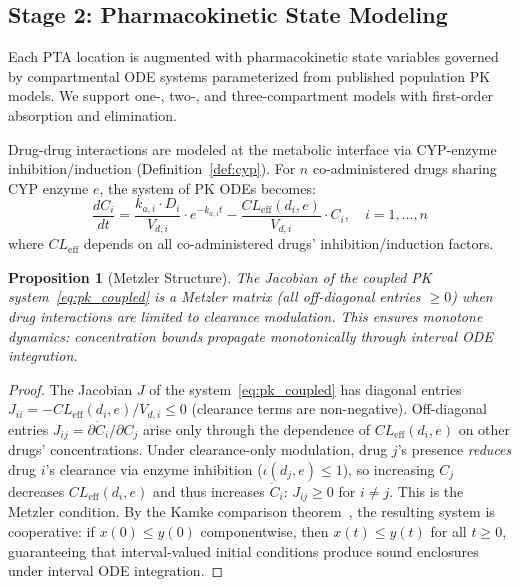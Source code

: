 \documentclass{article}
\newtheorem{proposition}[theorem]{Proposition}
\theoremstyle{definition}
\begin{document}
\subsection{Stage 2: Pharmacokinetic State Modeling}

Each PTA location is augmented with pharmacokinetic state variables governed by compartmental ODE systems parameterized from published population PK models. We support one-, two-, and three-compartment models with first-order absorption and elimination.

Drug-drug interactions are modeled at the metabolic interface via CYP-enzyme inhibition/induction (Definition~\ref{def:cyp}). For $n$ co-administered drugs sharing CYP enzyme $e$, the system of PK ODEs becomes:
\begin{equation}
\label{eq:pk_coupled}
\frac{dC_i}{dt} = \frac{k_{a,i} \cdot D_i}{V_{d,i}} \cdot e^{-k_{a,i} t} - \frac{CL_{\text{eff}}(d_i, e)}{V_{d,i}} \cdot C_i, \quad i = 1,\ldots,n
\end{equation}
where $CL_{\text{eff}}$ depends on all co-administered drugs' inhibition/induction factors.

\begin{proposition}[Metzler Structure]
\label{prop:metzler}
The Jacobian of the coupled PK system~\eqref{eq:pk_coupled} is a Metzler matrix (all off-diagonal entries $\geq 0$) when drug interactions are limited to clearance modulation. This ensures monotone dynamics: concentration bounds propagate monotonically through interval ODE integration.
\end{proposition}

\begin{proof}
The Jacobian $J$ of the system~\eqref{eq:pk_coupled} has diagonal entries $J_{ii} = -CL_{\text{eff}}(d_i, e)/V_{d,i} \leq 0$ (clearance terms are non-negative). Off-diagonal entries $J_{ij} = \partial \dot{C}_i / \partial C_j$ arise only through the dependence of $CL_{\text{eff}}(d_i, e)$ on other drugs' concentrations. Under clearance-only modulation, drug $j$'s presence \emph{reduces} drug $i$'s clearance via enzyme inhibition ($\iota(d_j, e) \leq 1$), so increasing $C_j$ decreases $CL_{\text{eff}}(d_i, e)$ and thus increases $\dot{C}_i$: $J_{ij} \geq 0$ for $i \neq j$. This is the Metzler condition. By the Kamke comparison theorem~\cite{kamke1932}, the resulting system is cooperative: if $x(0) \leq y(0)$ componentwise, then $x(t) \leq y(t)$ for all $t \geq 0$, guaranteeing that interval-valued initial conditions produce sound enclosures under interval ODE integration.
\end{proof}
\end{document}
